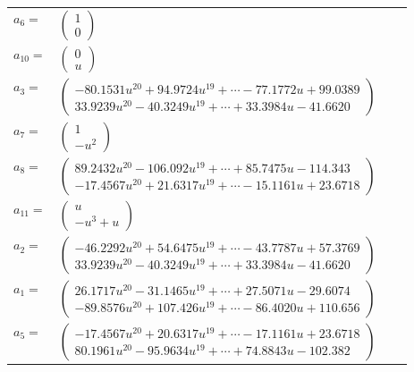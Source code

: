 \documentclass[1p]{elsarticle_modified}
\theoremstyle{definition}
\begin{document}
\begin{tabular}{m{7pt} m{180pt} m{7pt} m{180pt} }
\flushright $a_{6}=$&$\begin{pmatrix}1\\0\end{pmatrix}$ \\
\flushright $a_{10}=$&$\begin{pmatrix}0\\u\end{pmatrix}$ \\
\flushright $a_{3}=$&$\begin{pmatrix}-80.1531 u^{20}+94.9724 u^{19}+\cdots-77.1772 u+99.0389\\33.9239 u^{20}-40.3249 u^{19}+\cdots+33.3984 u-41.6620\end{pmatrix}$ \\
\flushright $a_{7}=$&$\begin{pmatrix}1\\- u^2\end{pmatrix}$ \\
\flushright $a_{8}=$&$\begin{pmatrix}89.2432 u^{20}-106.092 u^{19}+\cdots+85.7475 u-114.343\\-17.4567 u^{20}+21.6317 u^{19}+\cdots-15.1161 u+23.6718\end{pmatrix}$ \\
\flushright $a_{11}=$&$\begin{pmatrix}u\\- u^3+u\end{pmatrix}$ \\
\flushright $a_{2}=$&$\begin{pmatrix}-46.2292 u^{20}+54.6475 u^{19}+\cdots-43.7787 u+57.3769\\33.9239 u^{20}-40.3249 u^{19}+\cdots+33.3984 u-41.6620\end{pmatrix}$ \\
\flushright $a_{1}=$&$\begin{pmatrix}26.1717 u^{20}-31.1465 u^{19}+\cdots+27.5071 u-29.6074\\-89.8576 u^{20}+107.426 u^{19}+\cdots-86.4020 u+110.656\end{pmatrix}$ \\
\flushright $a_{5}=$&$\begin{pmatrix}-17.4567 u^{20}+20.6317 u^{19}+\cdots-17.1161 u+23.6718\\80.1961 u^{20}-95.9634 u^{19}+\cdots+74.8843 u-102.382\end{pmatrix}$ \\

\end{tabular}
\end{document}
